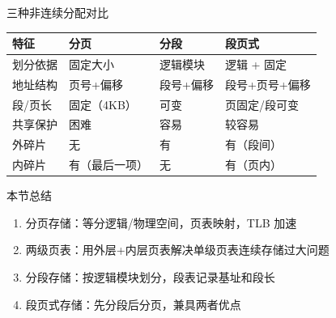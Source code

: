 \documentclass[10pt, aspectratio=169]{beamer}
\begin{document}
\begin{frame}{三种非连续分配对比}
    \begin{center}
        \begin{tabular}{|l|l|l|l|}
            \hline
            \textbf{特征} & \textbf{分页} & \textbf{分段} & \textbf{段页式} \\
            \hline
            划分依据 & 固定大小 & 逻辑模块 & 逻辑 + 固定 \\
            地址结构 & 页号+偏移 & 段号+偏移 & 段号+页号+偏移 \\
            段/页长 & 固定（4KB） & 可变 & 页固定/段可变 \\
            共享保护 & 困难 & 容易 & 较容易 \\
            外碎片 & 无 & 有 & 有（段间） \\
            内碎片 & 有（最后一项） & 无 & 有（页内） \\
            \hline
        \end{tabular}
    \end{center}
\end{frame}

\begin{frame}{本节总结}
    \begin{enumerate}
        \item 分页存储：等分逻辑/物理空间，页表映射，TLB 加速
        \item 两级页表：用外层+内层页表解决单级页表连续存储过大问题
        \item 分段存储：按逻辑模块划分，段表记录基址和段长
        \item 段页式存储：先分段后分页，兼具两者优点
    \end{enumerate}
\end{frame}
\end{document}

